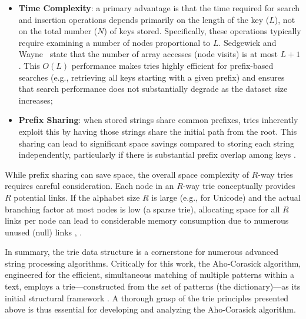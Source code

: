 \begin{itemize}
    \item \textbf{Time Complexity}: a primary advantage is that the time required for search and insertion operations depends primarily on the length of the key ($L$), not on the total number ($N$) of keys stored. Specifically, these operations typically require examining a number of nodes proportional to $L$. Sedgewick and Wayne~\cite{SedgewickWayne2011} state that the number of array accesses (node visits) is at most $L+1$. This $O(L)$ performance makes tries highly efficient for prefix-based searches (e.g., retrieving all keys starting with a given prefix) and ensures that search performance does not substantially degrade as the dataset size increases;
    \item \textbf{Prefix Sharing}: when stored strings share common prefixes, tries inherently exploit this by having those strings share the initial path from the root. This sharing can lead to significant space savings compared to storing each string independently, particularly if there is substantial prefix overlap among keys \cite{Fredkin1960}.
\end{itemize}

While prefix sharing can save space, the overall space complexity of $R$-way tries requires careful consideration. Each node in an $R$-way trie conceptually provides $R$ potential links. If the alphabet size $R$ is large (e.g., for Unicode) and the actual branching factor at most nodes is low (a sparse trie), allocating space for all $R$ links per node can lead to considerable memory consumption due to numerous unused (null) links \cite{Knuth1998}, \cite{SedgewickWayne2011}.

In summary, the trie data structure is a cornerstone for numerous advanced string processing algorithms. Critically for this work, the Aho-Corasick algorithm, engineered for the efficient, simultaneous matching of multiple patterns within a text, employs a trie---constructed from the set of patterns (the dictionary)---as its initial structural framework \cite{AhoCorasick1975}. A thorough grasp of the trie principles presented above is thus essential for developing and analyzing the Aho-Corasick algorithm.




